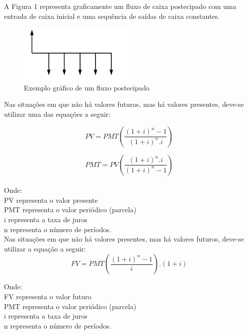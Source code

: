 \documentclass[
	article,			%
	11pt,				%
	oneside,			%
	a4paper,			%
	english,			%
	brazil,				%
	sumario=tradicional
	]{abntex2}
\begin{document}
A  Figura 1 representa graficamente um fluxo de caixa postecipado com uma entrada de caixa inicial e uma sequência de saídas de caixa constantes.
\begin{figure}
  \begin{center}
    \includegraphics[width=0.5\textwidth]{Fluxopostecipado.jpg}
    \caption{Exemplo gráfico de um fluxo postecipado}
    \label{fig:Fluxopostecipado}
  \end{center}
\end{figure}

Nas situações em que não há valores futuros, mas há valores presentes, deve-se utilizar uma das equações a seguir:

\begin{equation}
  PV = PMT \left( \frac{ ( 1 + i ) ^{n} - 1 }{ ( 1 + i ) ^{n} . i } \right) 
\end{equation}

\begin{equation}
  PMT = PV \left( \frac{ ( 1 + i ) ^{n} .i }{ ( 1 + i ) ^{n} - 1 } \right) 
\end{equation}
\\
\tiny Onde: \\   PV representa o valor presente \\ PMT representa o valor periódico (parcela) \\ i representa a taxa de juros \\ n representa o número de períodos.\\


\normalsize
Nas situações em que não há valores presentes, mas há valores futuros, deve-se utilizar a equação a seguir:
  \begin{equation}
    FV = PMT \left( \frac{ ( 1 + i ) ^{n} - 1 }{ i } \right) . ( 1 + i )
  \end{equation}


\tiny \noindent Onde: \\   FV representa o valor futuro \\ PMT representa o valor periódico (parcela) \\ i representa a taxa de juros \\ n representa o número de períodos.
\end{document}
